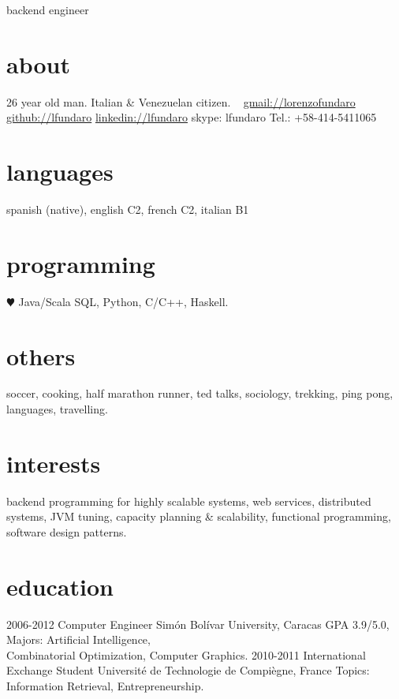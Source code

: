 \documentclass[]{friggeri-cv}
\begin{document}
       {backend engineer}


\begin{aside}
  \section{about}
    26 year old man.
    Italian \& Venezuelan citizen.
    ~
    \href{mailto:lorenzofundaro@gmail.com}{gmail://lorenzofundaro}
    \href{http://github.com/lfundaro}{github://lfundaro}
    \href{http://ve.linkedin.com/in/lfundaro/}{linkedin://lfundaro}
    skype: lfundaro
    Tel.: +58-414-5411065
  \section{languages}
    spanish (native),
   english C2, french C2,
   italian B1
  \section{programming}
    {\color{red} $\varheartsuit$} Java/Scala
    SQL, Python, C/C++, Haskell.
   \section{others}
   soccer, cooking,
   half marathon runner, 
   ted talks, sociology,
   trekking, ping pong,
   languages, travelling.
\end{aside}

\section{interests}

backend programming for highly scalable systems, web services, distributed systems, JVM 
tuning, capacity planning \& scalability, functional programming, software design patterns.

\section{education}

\begin{entrylist}
  \entry
    {\small 2006-2012}
    {Computer Engineer}
    {Simón Bolívar University, Caracas}
    {GPA 3.9/5.0, Majors: Artiﬁcial Intelligence,\\
     Combinatorial Optimization, Computer Graphics.}
  \entry
    {\small 2010-2011}
    {International Exchange Student}
    {Université de Technologie de Compiègne, France}
    {Topics: Information Retrieval, Entrepreneurship.}
\end{entrylist}
\end{document}
